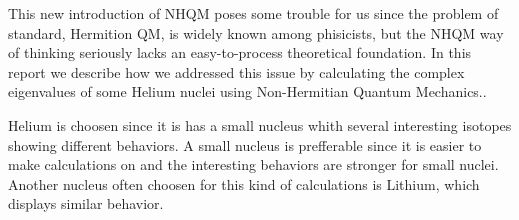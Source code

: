 
This new introduction of NHQM poses some trouble for us since the problem of standard, Hermition QM, is widely known among phisicists, but the NHQM way of thinking seriously lacks an easy-to-process theoretical foundation.
In this report we describe how we addressed this issue by calculating the complex eigenvalues of some Helium nuclei using Non-Hermitian Quantum Mechanics..

Helium is choosen since it is has a small nucleus whith several interesting isotopes showing different behaviors.
A small nucleus is prefferable since it is easier to make calculations on and the interesting behaviors are stronger for small nuclei.
Another nucleus often choosen for this kind of calculations is Lithium, which displays similar behavior.